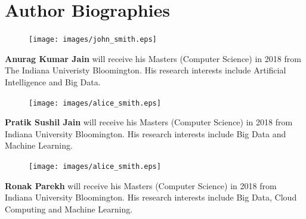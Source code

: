 \documentclass[9pt,twocolumn,twoside]{../../styles/osajnl}
\begin{document}
\section*{Author Biographies}
	\begingroup \setlength\intextsep{0pt}
	\begin{minipage}[t][3.2cm][t]{1.0\columnwidth}
	  \begin{figure}
	    \texttt{[image: images/john\_smith.eps]}
	  \end{figure}
	  \noindent
	  {\bfseries Anurag Kumar Jain} will receive his Masters (Computer Science)
	  in 2018 from The Indiana Univeristy Bloomington. His research
	  interests include Artificial Intelligence and Big Data.
	\end{minipage}
	\begin{minipage}[t][3.2cm][t]{1.0\columnwidth} %
	  \begin{figure}
	    \texttt{[image: images/alice\_smith.eps]}
	  \end{figure}
	  \noindent
	  {\bfseries Pratik Sushil Jain} will receive his Masters (Computer
	  Science) in 2018 from Indiana University Bloomington. His research
	  interests include Big Data and Machine Learning.
	\end{minipage}
	\begin{minipage}[t][3.2cm][t]{1.0\columnwidth} %
	  \begin{figure}
	    \texttt{[image: images/alice\_smith.eps]}
	  \end{figure}
	  \noindent
	  {\bfseries Ronak Parekh} will receive his Masters (Computer
          Science) in 2018 from Indiana University Bloomington. His
          research interests include Big Data, Cloud Computing and
          Machine Learning.
	\end{minipage}
        \endgroup
        
\end{document}
